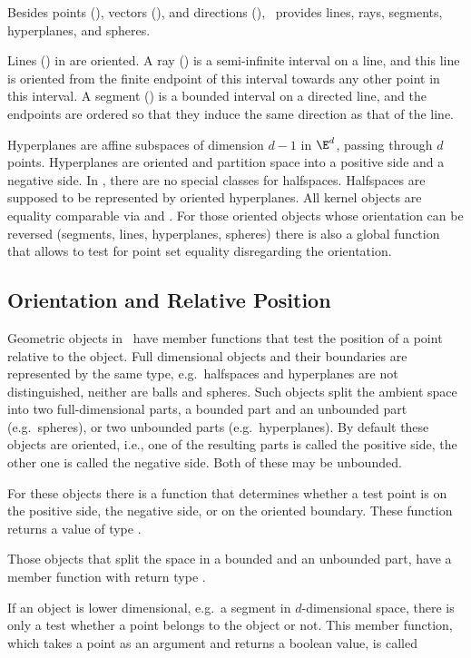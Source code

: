 Besides points (), vectors (), and
directions (), \cgal\ provides lines, rays,
segments, hyperplanes, and spheres.

Lines () in {\cgal} are oriented.  A ray
() is a semi-infinite interval on a line, and this line
is oriented from the finite endpoint of this interval towards any
other point in this interval. A segment () is a
bounded interval on a directed line, and the endpoints are ordered so
that they induce the same direction as that of the line.

Hyperplanes are affine subspaces of dimension $d-1$ in $\E^d$, passing
through $d$ points.  Hyperplanes are oriented and partition space into
a positive side and a negative side.  In \cgal, there are no special
classes for halfspaces.  Halfspaces are supposed to be represented by
oriented hyperplanes. All kernel objects are equality comparable via
 and . For those oriented objects
whose orientation can be reversed (segments, lines, hyperplanes,
spheres) there is also a global function  that
allows to test for point set equality disregarding the orientation.


\subsection{Orientation and Relative Position}

Geometric objects in \cgal\ have member functions that test the
position of a point relative to the object.  Full dimensional objects
and their boundaries are represented by the same type, e.g.\ 
halfspaces and hyperplanes are not distinguished, neither are balls
and spheres. Such objects split the ambient space into two
full-dimensional parts, a bounded part and an unbounded part (e.g.\ 
spheres), or two unbounded parts (e.g.\ hyperplanes). By default these
objects are oriented, i.e., one of the resulting parts is called the
positive side, the other one is called the negative side. Both of
these may be unbounded.

For these objects there is a function  that
determines whether a test point is on the positive side, the negative
side, or on the oriented boundary. These function returns a value of
type \ccc{Oriented_side}.

Those objects that split the space in a bounded and an unbounded part,
have a member function  with return type
\ccc{Bounded_side}.

If an object is lower dimensional, e.g.\ a segment in $d$-dimensional
space, there is only a test whether a point belongs to the object or
not. This member function, which takes a point as an argument and
returns a boolean value, is called \ccStyle{has_on()}

